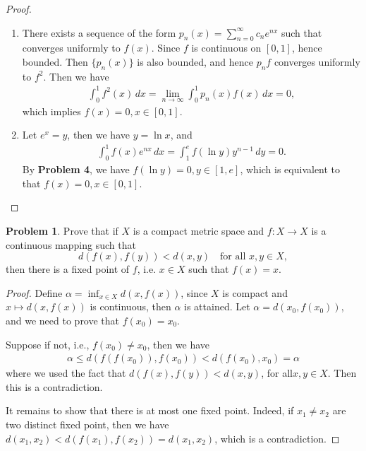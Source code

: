 \documentclass[11pt]{article}
\theoremstyle{definition}
\newtheorem{problem}{Problem}
\theoremstyle{definition}
\begin{document}
\begin{proof}
~\begin{enumerate}[label=(\alph*)]
    \item There exists a sequence of the form $p_n(x) = \sum^\infty_{n=0}c_n e^{nx}$ such that converges uniformly to $f(x)$. Since $f$ is continuous on $[0,1]$, hence bounded. Then $\{p_n(x)\}$ is also bounded, and hence $p_n f$ converges uniformly to $f^2$. Then we have
    \begin{align*}
        \int^1_0 f^2(x)\,dx = \lim_{n\to\infty} \int^1_0 p_n(x) f(x)\, dx = 0,
    \end{align*}
    which implies $f(x) = 0, x\in[0,1]$.
    \item Let $e^x = y$, then we have $y = \ln x$, and
    \begin{align*}
        \int_0^1 f(x) e^{nx}\, dx = \int_1^e f(\ln y) y^{n-1}\, dy = 0.
    \end{align*}
    By {\bf Problem 4}, we have $f(\ln y) = 0, y\in[1,e]$, which is equivalent to that $f(x) = 0, x\in[0,1]$.
\end{enumerate}
\end{proof}

\medskip

\begin{problem}
Prove that if $X$ is a compact metric space and $f:X\to X$
is a continuous mapping such that
$$
d(f(x),f(y))<d(x,y)
\quad
\mbox{for all $x,y\in X$},
$$
then there is a fixed point of $f$, i.e. $x\in X$ such that $f(x)=x$.
\end{problem}
\begin{proof}
Define $\alpha = \inf_{x\in X} d(x, f(x))$, since $X$ is compact and $x \mapsto d(x,f(x))$ is continuous, then $\alpha$ is attained. Let $\alpha = d(x_0,f(x_0))$, and we need to prove that $f(x_0) = x_0$.

Suppose if not, i.e., $f(x_0) \neq x_0$, then we have
\begin{align*}
    \alpha \leq d(f(f(x_0)), f(x_0)) < d(f(x_0), x_0) = \alpha
\end{align*}
where we used the fact that $d(f(x),f(y))<d(x,y)$, for all$x,y\in X$. Then this is a contradiction.

It remains to show that there is at most one fixed point. Indeed, if $x_1 \neq x_2$ are two distinct fixed point, then we have $d(x_1, x_2) < d(f(x_1), f(x_2)) = d(x_1, x_2)$, which is a contradiction.
\end{proof}

\medskip
\end{document}
